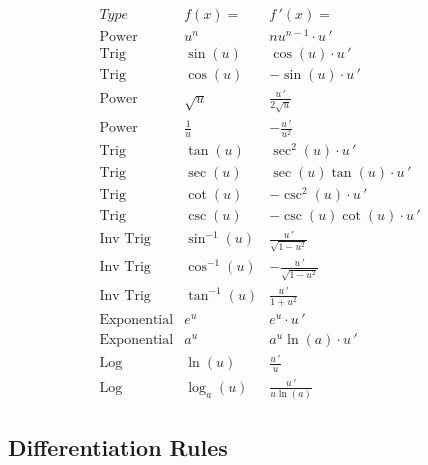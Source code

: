 \documentclass[handout]{ximera}
\begin{document}
\begin{center}
\[
\begin{array}{c|c|c}
		Type & f(x)= & f\,'(x)=  \\
		\hline
		\text{Power} & u^n & nu^{n-1}\cdot u\,'  \\[8pt]
		\hline
		\text{Trig} & \sin\left(u\right) & \cos\left(u\right) \cdot u\,' \\[8pt]
		\text{Trig} & \cos\left(u\right) & -\sin\left(u\right)\cdot u\,'  \\[8pt]
		\hline
		\text{Power} & \sqrt{u} & \displaystyle \frac{u\,' }{2\sqrt {u}}\\[8pt]
		\text{Power} & \displaystyle \frac{1}{u} & -\displaystyle \frac{u\,' }{u^2}\\[8pt]
	  \hline
	  \text{Trig} & \tan\left(u\right) & \sec^2\left(u\right) \cdot u\,'  \\[8pt]
		\text{Trig} & \sec\left(u\right) & \sec\left(u\right)\tan\left(u\right) \cdot u\,'  \\[8pt]
		\hline
		\text{Trig} & \cot\left(u\right) & -\csc^2\left(u\right) \cdot u\,'   \\[8pt]
		\text{Trig} & \csc\left(u\right) & -\csc\left(u\right)\cot\left(u\right) \cdot u\,'   \\[8pt]
		\hline
		\text{Inv Trig} & \sin^{-1}\left(u\right) &   \displaystyle \frac{u\,' }{\sqrt{1-u^2}}  \\[8pt]
		\text{Inv Trig} & \cos^{-1}\left(u\right) &   \displaystyle -\frac{u\,' }{\sqrt{1-u^2}}\\[8pt]
		\text{Inv Trig} & \tan^{-1}\left(u\right) &   \displaystyle \frac{u\,' }{1+u^2} \\[8pt]
		\hline
		\text{Exponential} & e^{u} & e^{u} \cdot u\,' \\[8pt]
		\text{Exponential} & a^{u} & a^{u}\ln(a) \cdot u\,' \\[8pt]
		\hline
		\text{Log} & \ln\left(u\right) &   \displaystyle \frac{u\,'}{u} \\[8pt]
		\text{Log} & \log_a\left(u\right) &   \displaystyle \frac{u\,'}{u\ln(a)}
	\end{array}
    \]
\end{center}



\subsection{Differentiation Rules}
\end{document}
